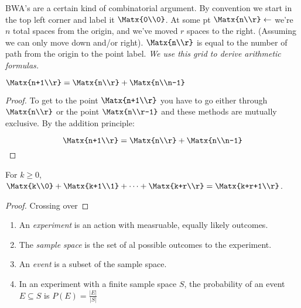BWA's are a certain kind of combinatorial argument. By convention we start in the top left corner and label it $\Matx{0\\0}$. At some pt $\Matx{n\\r} \leftarrow$ we're $n$ total spaces from the origin, and we've moved $r$ spaces to the right. (Assuming we can only move down and/or right). $\Matx{n\\r}$ is equal to the number of path from the origin to the point label. \emph{We use this grid to derive arithmetic formulas.}

\begin{example}
$\Matx{n+1\\r} = \Matx{n\\r}+\Matx{n\\n-1}$
\end{example}
\begin{proof}
To get to the point $\Matx{n+1\\r}$ you have to go either through $\Matx{n\\r}$ or the point $\Matx{n\\r-1}$ and these methods are mutually exclusive. By the addition principle: 

\[ \Matx{n+1\\r} = \Matx{n\\r}+\Matx{n\\n-1} \]
\end{proof}
\begin{example}
For $k\ge0$, $\Matx{k\\0}+\Matx{k+1\\1}+\cdots+\Matx{k+r\\r}=\Matx{k+r+1\\r}$.
\end{example}
\begin{proof}
Crossing over
\end{proof}
\begin{enumerate}
\item An \emph{experiment} is an action with measruable, equally likely outcomes.
\item The \emph{sample space} is the set of al possible outcomes to the experiment.
\item An \emph{event} is a subset of the sample space.
\item In an experiment with a finite sample space $S$, the probability of an event $E\subseteq S$ is $P(E) = \frac{|E|}{|S|}$
\end{enumerate}
